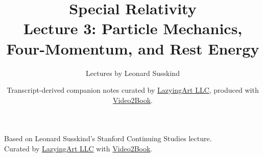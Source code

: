 \documentclass[11pt,oneside]{book}
\begin{document}
\frontmatter
\title{Special Relativity\\Lecture 3: Particle Mechanics, Four-Momentum, and Rest Energy}
\author{Lectures by Leonard Susskind}
\date{Transcript-derived companion notes curated by \href{https://lazying.art}{LazyingArt LLC}, produced with \href{https://github.com/lachlanchen/Video2Book}{Video2Book}.}
\maketitle
\setcounter{page}{2}
\begin{center}
\small Based on Leonard Susskind's Stanford Continuing Studies lecture.\\
Curated by \href{https://lazying.art}{LazyingArt LLC} with \href{https://github.com/lachlanchen/Video2Book}{Video2Book}.
\end{center}
\clearpage
\mainmatter

\end{document}
